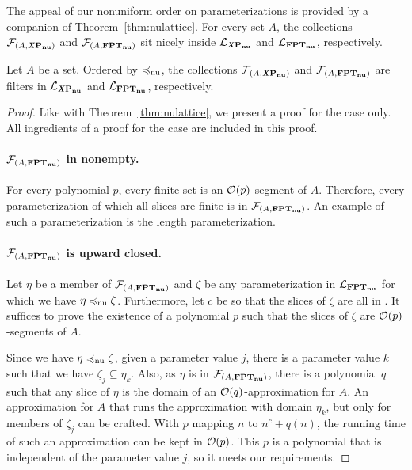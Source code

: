 The appeal of our nonuniform order on parameterizations is provided by a companion of Theorem~\ref{thm:nulattice}.
For every set $A$, the collections $\mathcal{F}_{(A, \textnormal{\textbf{\textit{X}P$_\textbf{nu}$}})}$ and $\mathcal{F}_{(A, \textnormal{\textbf{FPT$_\textbf{nu}$}})}$ sit nicely \parencite{davey2002introduction} inside $\mathcal{L}_{\textnormal{\textbf{\textit{X}P$_\textbf{nu}$}}}$ and $\mathcal{L}_{\textnormal{\textbf{FPT$_\textbf{nu}$}}}$, respectively.
\begin{theorem}
\label{thm:nufilter}
  Let $A$ be a set.
  Ordered by $\preccurlyeq_\mathrm{nu}$, the collections $\mathcal{F}_{(A, \textnormal{\textbf{\textit{X}P$_\textbf{nu}$}})}$ and $\mathcal{F}_{(A, \textnormal{\textbf{FPT$_\textbf{nu}$}})}$ are filters in $\mathcal{L}_{\textnormal{\textbf{\textit{X}P$_\textbf{nu}$}}}$ and $\mathcal{L}_{\textnormal{\textbf{FPT$_\textbf{nu}$}}}$, respectively.
\end{theorem}
\begin{proof}
  Like with Theorem~\ref{thm:nulattice}, we present a proof for the  case only.
  All ingredients of a proof for the  case are included in this proof.

  \paragraph{$\mathcal{F}_{(A, \textnormal{\textbf{FPT$_\textbf{nu}$}})}$ in nonempty.}
  For every polynomial $p$, every finite set is an $\operatorname{\mathcal{O}}(p)$-segment of $A$.
  Therefore, every parameterization of which all slices are finite is in $\mathcal{F}_{(A, \textnormal{\textbf{FPT$_\textbf{nu}$}})}$.
  An example of such a parameterization is the length parameterization.

  \paragraph{$\mathcal{F}_{(A, \textnormal{\textbf{FPT$_\textbf{nu}$}})}$ is upward closed.}
  Let $\eta$ be a member of $\mathcal{F}_{(A, \textnormal{\textbf{FPT$_\textbf{nu}$}})}$ and $\zeta$ be any parameterization in $\mathcal{L}_{\textnormal{\textbf{FPT$_\textbf{nu}$}}}$ for which we have $\eta \preccurlyeq_\mathrm{nu} \zeta$.
  Furthermore, let $c$ be so that the slices of $\zeta$ are all in .
  It suffices to prove the existence of a polynomial $p$ such that the slices of $\zeta$ are $\operatorname{\mathcal{O}}(p)$-segments of $A$.

  Since we have $\eta \preccurlyeq_\mathrm{nu} \zeta$, given a parameter value $j$, there is a parameter value $k$ such that we have $\zeta_j \subseteq \eta_k$.
  Also, as $\eta$ is in $\mathcal{F}_{(A, \textnormal{\textbf{FPT$_\textbf{nu}$}})}$, there is a polynomial $q$ such that any slice of $\eta$ is the domain of an $\operatorname{\mathcal{O}}(q)$-approximation for $A$.
  An approximation for $A$ that runs the approximation with domain $\eta_k$, but only for members of $\zeta_j$ can be crafted.
  With $p$ mapping $n$ to $n^c + q(n)$, the running time of such an approximation can be kept in $\operatorname{\mathcal{O}}(p)$.
  This $p$ is a polynomial that is independent of the parameter value $j$, so it meets our requirements.


\end{proof}
